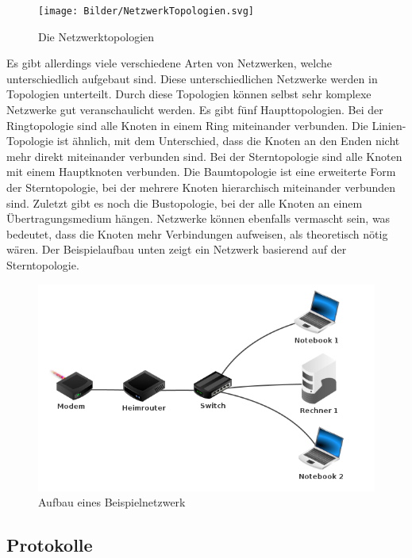 \documentclass[12pt]{article}
\begin{document}
\begin{figure}
	\centering
	\texttt{[image: Bilder/NetzwerkTopologien.svg]}
	\caption{Die Netzwerktopologien \cite{topologien-darstellung}}
	\label{fig:figure5}
\end{figure}

Es gibt allerdings viele verschiedene Arten von Netzwerken, welche unterschiedlich aufgebaut sind. Diese unterschiedlichen Netzwerke werden in Topologien unterteilt. Durch diese Topologien können selbst sehr komplexe Netzwerke gut veranschaulicht werden. Es gibt fünf Haupttopologien. Bei der Ringtopologie sind alle Knoten in einem Ring miteinander verbunden. Die Linien-Topologie ist ähnlich, mit dem Unterschied, dass die Knoten an den Enden nicht mehr direkt miteinander verbunden sind. Bei der Sterntopologie sind alle Knoten mit einem Hauptknoten verbunden. Die Baumtopologie ist eine erweiterte Form der Sterntopologie, bei der mehrere Knoten hierarchisch miteinander verbunden sind. Zuletzt gibt es noch die Bustopologie, bei der alle Knoten an einem Übertragungsmedium hängen. Netzwerke können ebenfalls vermascht sein, was bedeutet, dass die Knoten mehr Verbindungen aufweisen, als theoretisch nötig wären.\cite{topologien-kurthelec} Der Beispielaufbau unten zeigt ein Netzwerk basierend auf der Sterntopologie.

\begin{figure}[h]
	\centering
	\includegraphics[scale=0.5]{Bilder/beispielnetzwerk}
	\caption{Aufbau eines Beispielnetzwerk \cite{network-self}}
	\label{fig:figure4}
\end{figure}






\subsection{Protokolle}
\end{document}

